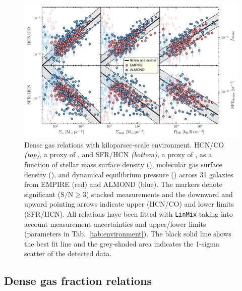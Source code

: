 \documentclass[letter, longauth]{aa} %
\begin{document}
\begin{figure}
\centering
\includegraphics[width=\textwidth]{Figures/HCN_scaling_relations_compressed.pdf}
\caption{Dense gas relations with kiloparsec-scale environment. 
HCN/CO \textit{(top)}, a proxy of \fdense, and SFR/HCN \textit{(bottom)}, a proxy of \sfedense, as a function of stellar mass surface density (\sigstar), molecular gas surface density (\sigmol), and dynamical equilibrium pressure (\pde) across 31 galaxies from EMPIRE (red) and ALMOND (blue).
The markers denote significant ($\mathrm{S/N}\geq 3$) stacked measurements and the downward and upward pointing arrows indicate upper (HCN/CO) and lower limits (SFR/HCN).
All relations have been fitted with \texttt{LinMix} taking into account measurement uncertainties and upper/lower limits (parameters in Tab.~\ref{tab:environment}).
The black solid line shows the best fit line and the grey-shaded area indicates the 1-sigma scatter of the detected data.
}
\label{fig:environment_relations}
\end{figure}

\subsection{Dense gas fraction relations}
\end{document}
